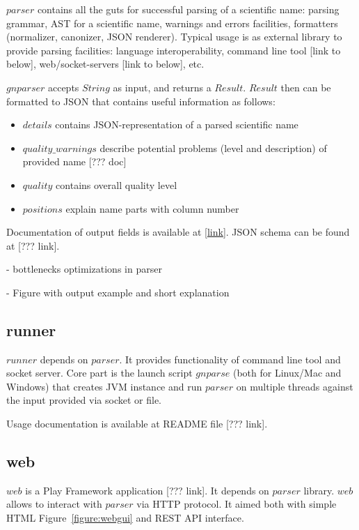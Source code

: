 \documentclass{bmcart}
\begin{document}
$parser$ contains all the guts for successful parsing of a scientific name:
parsing grammar, AST for a scientific name, warnings and errors facilities,
formatters (normalizer, canonizer, JSON renderer). Typical usage is as
external library to provide parsing facilities: language interoperability,
command line tool [link to below], web/socket-servers [link to below], etc.

$gnparser$ accepts $String$ as input, and returns a $Result$. $Result$ then
can be formatted to JSON that contains useful information as follows:

\begin{itemize}
  \item $details$ contains JSON-representation of a parsed scientific name
  \item $quality\_warnings$ describe potential problems (level and
  description) of provided name [??? doc]
  \item $quality$ contains overall quality level
  \item $positions$ explain name parts with column number
\end{itemize}

Documentation of output fields is available at [\href{https://github.co
m/GlobalNamesArchitecture/gnparser/blob/master/JSON_FIELDS.md}{link}]. JSON
schema can be found at [??? link].

- bottlenecks optimizations in parser

- Figure with output example and short explanation

\subsection*{runner}

$runner$ depends on $parser$. It provides functionality of command line tool
and socket server. Core part is the launch script $gnparse$ (both for
Linux/Mac and Windows) that creates JVM instance and run $parser$ on multiple
threads against the input provided via socket or file.

Usage documentation is available at README file [??? link].

\subsection*{web}

$web$ is a Play Framework application [??? link]. It depends on $parser$
library. $web$ allows to interact with $parser$ via HTTP protocol. It aimed
both with simple HTML Figure~\ref{figure:webgui} and REST API interface.
\end{document}
